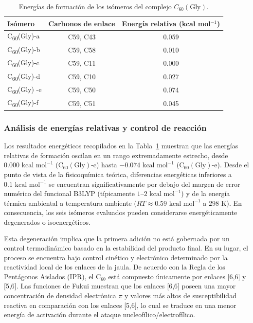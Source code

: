 \begin{table}[H]
    \centering
    \caption{Energías de formación de los isómeros del complejo $C_{60}(\text{Gly})$.}
    \label{tab:isomeros-gly1}
    \renewcommand{\arraystretch}{1.15}
    \begin{tabular}{lcc}
        \toprule
        \textbf{Isómero} & \textbf{Carbonos de enlace} & \textbf{Energía relativa (kcal mol$^{-1}$)} \\
        \midrule
      C\textsubscript{60}(Gly)-a & C59, C43 & 0.059 \\
      C\textsubscript{60}(Gly)-b & C59, C58 & 0.010 \\
         C\textsubscript{60}(Gly)-c & C59, C11 & 0.000 \\
         C\textsubscript{60}(Gly)-d & C59, C10 & 0.027 \\
        C\textsubscript{60}(Gly) -e & C59, C50 & 0.074 \\
         C\textsubscript{60}(Gly)-f & C59, C51 & 0.045 \\
        \bottomrule
    \end{tabular}
\end{table}

\subsubsection{Análisis de energías relativas y control de reacción}

Los resultados energéticos recopilados en la Tabla~\ref{tab:isomeros-gly1} muestran que las energías relativas de formación oscilan en un rango extremadamente estrecho, desde $0.000\text{ kcal mol}^{-1}$ ($\text{C}_{60}(\text{Gly})$-c) hasta $-0.074\text{ kcal mol}^{-1}$ ($\text{C}_{60}(\text{Gly})$-e). Desde el punto de vista de la fisicoquímica teórica, diferencias energéticas inferiores a $0.1\text{ kcal mol}^{-1}$ se encuentran significativamente por debajo del margen de error numérico del funcional B3LYP (típicamente $1\text{--}2\text{ kcal mol}^{-1}$) y de la energía térmica ambiental a temperatura ambiente ($RT \approx 0.59\text{ kcal mol}^{-1}$ a $298\text{ K}$). En consecuencia, los seis isómeros evaluados pueden considerarse energéticamente degenerados o isoenergéticos.

Esta degeneración implica que la primera adición no está gobernada por un control termodinámico basado en la estabilidad del producto final. En su lugar, el proceso se encuentra bajo control cinético y electrónico determinado por la reactividad local de los enlaces de la jaula. De acuerdo con la Regla de los Pentágonos Aislados (IPR), el $\text{C}_{60}$ está compuesto únicamente por enlaces [6,6] y [5,6]. Las funciones de Fukui muestran que los enlaces [6,6] poseen una mayor concentración de densidad electrónica $\pi$ y valores más altos de susceptibilidad reactiva en comparación con los enlaces [5,6], lo cual se traduce en una menor energía de activación durante el ataque nucleofílico/electrofílico.

